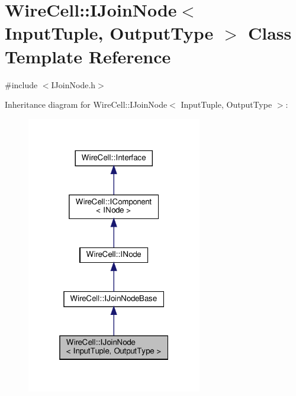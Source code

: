\hypertarget{class_wire_cell_1_1_i_join_node}{}\section{Wire\+Cell\+:\+:I\+Join\+Node$<$ Input\+Tuple, Output\+Type $>$ Class Template Reference}
\label{class_wire_cell_1_1_i_join_node}


{\ttfamily \#include $<$I\+Join\+Node.\+h$>$}



Inheritance diagram for Wire\+Cell\+:\+:I\+Join\+Node$<$ Input\+Tuple, Output\+Type $>$\+:
\nopagebreak
\begin{figure}[H]
\begin{center}
\leavevmode
\includegraphics[width=217pt]{class_wire_cell_1_1_i_join_node__inherit__graph}
\end{center}
\end{figure}


